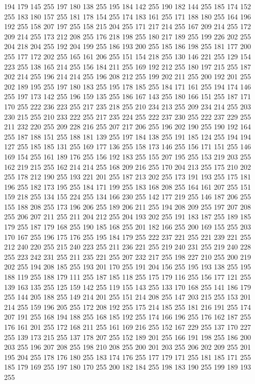 194 179 145 255 197 180 138 255 195 184 142 255 190 182 144 255 185 174 152 255 183 180 157 255 181 178 154 255 174 183 161 255 171 188 180 255 164 196 192 255 158 207 197 255 158 215 204 255 171 217 214 255 167 209 214 255 172 209 214 255 173 212 208 255
176 218 198 255 180 217 189 255 199 226 202 255 204 218 204 255 192 204 199 255 186 193 200 255 185 186 198 255 181 177 200 255 177 172 202 255 165 161 206 255 151 154 218 255 130 146 221 255 129 154 223 255 138 165 214 255 156 184 211 255 169 192 212 255
180 197 215 255 187 202 214 255 196 214 214 255 196 208 212 255 199 202 211 255 200 192 201 255 202 189 195 255 197 180 183 255 195 178 185 255 184 171 161 255 194 174 146 255 197 173 142 255 196 159 135 255 186 167 143 255 180 166 151 255 187 171 170 255
222 236 223 255 217 235 218 255 210 234 213 255 209 234 214 255 203 230 215 255 210 233 222 255 217 235 224 255 222 237 230 255 222 237 229 255 211 232 220 255 209 228 216 255 207 217 206 255 196 202 190 255 190 192 164 255 187 188 151 255 188 181 139 255
197 184 138 255 191 185 124 255 194 194 127 255 185 185 131 255 169 177 136 255 158 173 146 255 156 171 151 255 146 169 154 255 161 189 176 255 156 192 183 255 155 207 195 255 153 219 203 255 162 219 215 255 162 214 214 255 168 209 216 255 170 204 213 255
175 210 202 255 178 212 190 255 193 221 201 255 187 213 202 255 173 191 193 255 175 181 196 255 182 173 195 255 184 171 199 255 183 168 208 255 164 161 207 255 151 159 218 255 134 155 224 255 134 166 230 255 142 177 219 255 146 187 206 255 155 188 208 255
173 196 206 255 189 206 211 255 194 208 209 255 197 207 208 255 206 207 211 255 211 204 212 255 204 193 202 255 191 183 187 255 189 185 179 255 187 179 168 255 190 185 168 255 201 182 166 255 200 169 155 255 203 170 167 255 196 175 176 255 195 184 179 255
222 237 221 255 221 239 221 255 212 240 220 255 215 240 223 255 211 236 221 255 219 240 231 255 219 240 228 255 223 242 231 255 211 235 221 255 207 232 217 255 198 227 210 255 200 219 202 255 194 208 185 255 193 201 170 255 191 204 156 255 195 193 138 255
195 188 119 255 188 179 111 255 187 185 118 255 175 179 116 255 156 177 121 255 139 163 135 255 125 159 142 255 119 155 143 255 133 170 168 255 141 186 179 255 144 205 188 255 149 214 201 255 151 214 208 255 147 203 215 255 153 201 214 255 159 196 205 255
172 208 192 255 175 214 185 255 181 216 191 255 174 207 191 255 168 194 188 255 168 185 192 255 174 166 196 255 176 162 187 255 176 161 201 255 172 168 211 255 161 169 216 255 152 167 229 255 137 170 227 255 139 173 215 255 137 178 207 255 152 189 201 255
166 191 198 255 186 200 203 255 196 207 208 255 198 210 208 255 200 201 203 255 206 202 209 255 201 195 204 255 178 176 180 255 183 174 176 255 177 179 171 255 181 185 171 255 185 179 169 255 197 180 170 255 200 182 184 255 198 183 190 255 199 189 193 255
